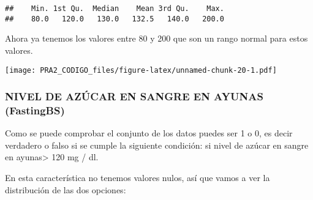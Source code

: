 \documentclass[
]{article}
\newenvironment{Shaded}{\begin{snugshade}}{\end{snugshade}}
\newcommand{\AttributeTok}[1]{\textcolor[rgb]{0.80,0.80,0.80}{#1}}
\newcommand{\DecValTok}[1]{\textcolor[rgb]{0.86,0.86,0.80}{#1}}
\newcommand{\FloatTok}[1]{\textcolor[rgb]{0.75,0.75,0.82}{#1}}
\newcommand{\FunctionTok}[1]{\textcolor[rgb]{0.94,0.94,0.56}{#1}}
\newcommand{\NormalTok}[1]{\textcolor[rgb]{0.80,0.80,0.80}{#1}}
\newcommand{\OtherTok}[1]{\textcolor[rgb]{0.94,0.94,0.56}{#1}}
\newcommand{\SpecialCharTok}[1]{\textcolor[rgb]{0.86,0.64,0.64}{#1}}
\newcommand{\StringTok}[1]{\textcolor[rgb]{0.80,0.58,0.58}{#1}}
\begin{document}
\begin{verbatim}
##    Min. 1st Qu.  Median    Mean 3rd Qu.    Max. 
##    80.0   120.0   130.0   132.5   140.0   200.0
\end{verbatim}

Ahora ya tenemos los valores entre 80 y 200 que son un rango normal para
estos valores.

\begin{Shaded}
\end{Shaded}

\texttt{[image: PRA2\_CODIGO\_files/figure-latex/unnamed-chunk-20-1.pdf]}

\hypertarget{nivel-de-azuxfacar-en-sangre-en-ayunas-fastingbs}{%
\subsubsection{NIVEL DE AZÚCAR EN SANGRE EN AYUNAS
(FastingBS)}\label{nivel-de-azuxfacar-en-sangre-en-ayunas-fastingbs}}

Como se puede comprobar el conjunto de los datos puedes ser 1 o 0, es
decir verdadero o falso si se cumple la siguiente condición: si nivel de
azúcar en sangre en ayunas\textgreater{} 120 mg / dl.

En esta característica no tenemos valores nulos, así que vamos a ver la
distribución de las dos opciones:
\end{document}
